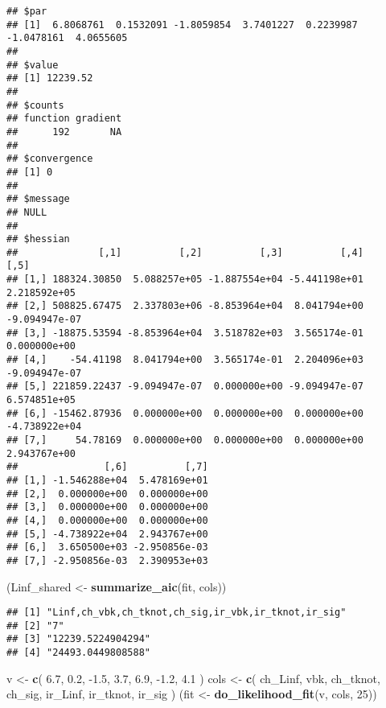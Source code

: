 \documentclass[
]{article}
\newenvironment{Shaded}{\begin{snugshade}}{\end{snugshade}}
\newcommand{\DecValTok}[1]{\textcolor[rgb]{0.00,0.00,0.81}{#1}}
\newcommand{\FloatTok}[1]{\textcolor[rgb]{0.00,0.00,0.81}{#1}}
\newcommand{\KeywordTok}[1]{\textcolor[rgb]{0.13,0.29,0.53}{\textbf{#1}}}
\newcommand{\NormalTok}[1]{#1}
\newcommand{\StringTok}[1]{\textcolor[rgb]{0.31,0.60,0.02}{#1}}
\begin{document}
\begin{verbatim}
## $par
## [1]  6.8068761  0.1532091 -1.8059854  3.7401227  0.2239987 -1.0478161  4.0655605
## 
## $value
## [1] 12239.52
## 
## $counts
## function gradient 
##      192       NA 
## 
## $convergence
## [1] 0
## 
## $message
## NULL
## 
## $hessian
##              [,1]          [,2]          [,3]          [,4]          [,5]
## [1,] 188324.30850  5.088257e+05 -1.887554e+04 -5.441198e+01  2.218592e+05
## [2,] 508825.67475  2.337803e+06 -8.853964e+04  8.041794e+00 -9.094947e-07
## [3,] -18875.53594 -8.853964e+04  3.518782e+03  3.565174e-01  0.000000e+00
## [4,]    -54.41198  8.041794e+00  3.565174e-01  2.204096e+03 -9.094947e-07
## [5,] 221859.22437 -9.094947e-07  0.000000e+00 -9.094947e-07  6.574851e+05
## [6,] -15462.87936  0.000000e+00  0.000000e+00  0.000000e+00 -4.738922e+04
## [7,]     54.78169  0.000000e+00  0.000000e+00  0.000000e+00  2.943767e+00
##               [,6]          [,7]
## [1,] -1.546288e+04  5.478169e+01
## [2,]  0.000000e+00  0.000000e+00
## [3,]  0.000000e+00  0.000000e+00
## [4,]  0.000000e+00  0.000000e+00
## [5,] -4.738922e+04  2.943767e+00
## [6,]  3.650500e+03 -2.950856e-03
## [7,] -2.950856e-03  2.390953e+03
\end{verbatim}

\begin{Shaded}
\begin{Highlighting}[]
\NormalTok{(Linf\_shared \textless{}{-}}\StringTok{ }\KeywordTok{summarize\_aic}\NormalTok{(fit, cols))}
\end{Highlighting}
\end{Shaded}

\begin{verbatim}
## [1] "Linf,ch_vbk,ch_tknot,ch_sig,ir_vbk,ir_tknot,ir_sig"
## [2] "7"                                                 
## [3] "12239.5224904294"                                  
## [4] "24493.0449808588"
\end{verbatim}

\begin{Shaded}
\begin{Highlighting}[]
\NormalTok{v \textless{}{-}}\StringTok{ }\KeywordTok{c}\NormalTok{(}
  \FloatTok{6.7}\NormalTok{, }\FloatTok{0.2}\NormalTok{, }\FloatTok{{-}1.5}\NormalTok{,  }\FloatTok{3.7}\NormalTok{,}
  \FloatTok{6.9}\NormalTok{,  }\FloatTok{{-}1.2}\NormalTok{,  }\FloatTok{4.1}
\NormalTok{) }
\NormalTok{cols \textless{}{-}}\StringTok{ }\KeywordTok{c}\NormalTok{(}
  \StringTok{\textquotesingle{}ch\_Linf\textquotesingle{}}\NormalTok{, }\StringTok{\textquotesingle{}vbk\textquotesingle{}}\NormalTok{, }\StringTok{\textquotesingle{}ch\_tknot\textquotesingle{}}\NormalTok{, }\StringTok{\textquotesingle{}ch\_sig\textquotesingle{}}\NormalTok{,}
  \StringTok{\textquotesingle{}ir\_Linf\textquotesingle{}}\NormalTok{, }\StringTok{\textquotesingle{}ir\_tknot\textquotesingle{}}\NormalTok{, }\StringTok{\textquotesingle{}ir\_sig\textquotesingle{}}
\NormalTok{)}
\NormalTok{(fit \textless{}{-}}\StringTok{ }\KeywordTok{do\_likelihood\_fit}\NormalTok{(v, cols, }\DecValTok{25}\NormalTok{))}
\end{Highlighting}
\end{Shaded}
\end{document}
